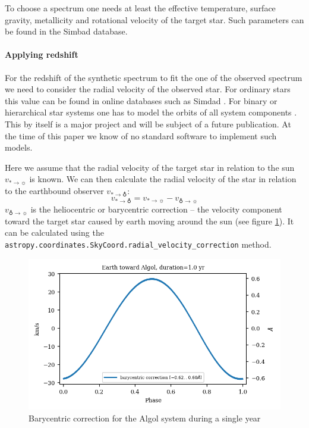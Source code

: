 \documentclass[10pt,a4paper,notitlepage,twocolumn]{article}
\begin{document}
To choose a spectrum one needs at least the effective temperature, surface gravity, metallicity and rotational velocity of the target star.
Such parameters can be found in the Simbad \cite{Simbad} database.



\paragraph{Applying redshift}

For the redshift of the synthetic spectrum to fit the one of the observed spectrum we need to consider the radial velocity of the observed star.
For ordinary stars this value can be found in online databases such as Simdad \cite{Simbad}.
For binary or hierarchical star systems one has to model the orbits of all system components \cite{Gerlach2015}.
This by itself is a major project and will be subject of a future publication.
At the time of this paper we know of no standard software to implement such models.

Here we assume that the radial velocity of the target star in relation to the sun $v_{* \rightarrow \sun}$ is known.
We can then calculate the radial velocity of the star in relation to the earthbound observer $v_{* \rightarrow \earth}$:
\begin{equation}
	\label{eq:rv}
	v_{* \rightarrow \earth} = v_{* \rightarrow \sun} - v_{\earth \rightarrow \sun}
\end{equation}
$v_{\earth \rightarrow \sun}$ is the heliocentric or barycentric correction -- the velocity component toward the target star caused by earth moving around the sun (see figure \ref*{algol_bary}).
It can be calculated using the \texttt{astropy.\-coordinates.\-SkyCoord.\-radial\_\-velocity\_\-correction} method.

\begin{figure}[ht]
	\includegraphics[width=\columnwidth]{img/algol_bary.png}
	\caption{Barycentric correction for the Algol system during a single year}
	\label{algol_bary}
\end{figure}
\end{document}
